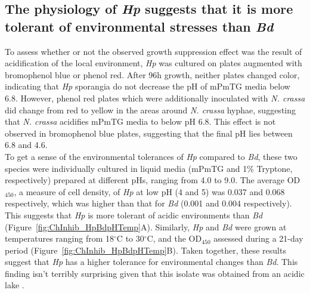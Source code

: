 \subsection{The physiology of \textit{Hp} suggests that it is more tolerant of environmental stresses than \textit{Bd}}
To assess whether or not the observed growth suppression effect was the result of acidification of the local environment, \textit{Hp} was cultured on plates augmented with bromophenol blue or phenol red. After 96h growth, neither plates changed color, indicating that \textit{Hp} sporangia do not decrease the pH of mPmTG media below 6.8. However, phenol red plates which were additionally inoculated with \textit{N. crassa} did change from red to yellow in the areas around \textit{N. crassa} hyphae, suggesting that \textit{N. crassa} acidifies mPmTG media to below pH 6.8. This effect is not observed in bromophenol blue plates, suggesting that the final pH lies between 6.8 and 4.6.\\
\indent To get a sense of the environmental tolerances of \textit{Hp} compared to \textit{Bd}, these two species were individually cultured in liquid media (mPmTG and 1\% Tryptone, respectively) prepared at different pHs, ranging from 4.0 to 9.0. The average OD$_{450}$, a measure of cell density, of \textit{Hp} at low pH (4 and 5) was 0.037 and 0.068 respectively, which was higher than that for \textit{Bd} (0.001 and 0.004 respectively). This suggests that \textit{Hp} is more tolerant of acidic environments than \textit{Bd} (Figure~\ref{fig:ChInhib_HpBdpHTemp}A). Similarly, \textit{Hp} and \textit{Bd} were grown at temperatures ranging from 18$^{\circ}$C to 30$^{\circ}$C, and the OD$_{450}$ assessed during a 21-day period (Figure~\ref{fig:ChInhib_HpBdpHTemp}B). Taken together, these results suggest that \textit{Hp} has a higher tolerance for environmental changes than \textit{Bd}. This finding isn’t terribly surprising given that this isolate was obtained from an acidic lake \cite{Longcore2011}.\\

